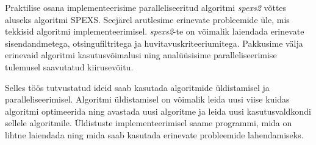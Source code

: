 Praktilise osana implementeerisime paralleliseeritud algoritmi \emph{spexs2} võttes aluseks algoritmi SPEXS\cite{spexs}. Seejärel arutlesime erinevate probleemide üle, mis tekkisid algoritmi implementeerimisel. \emph{spexs2}-te on võimalik laiendada erinevate sisendandmetega, otsingufiltritega ja huvitavuskriteeriumitega. Pakkusime välja erinevaid algoritmi kasutusvõimalusi ning analüüsisime paralleliseerimise tulemusel saavutatud kiirusevõitu.

Selles töös tutvustatud ideid saab kasutada algoritmide üldistamisel ja paralleliseerimisel. Algoritmi üldistamisel on võimalik leida uusi viise kuidas algoritmi optimeerida ning avastada uusi algoritme ja leida uusi kasutusvaldkondi sellele algoritmile. Üldistuste implementeerimisel saame programmi, mida on lihtne laiendada ning mida saab kasutada erinevate probleemide lahendamiseks.

